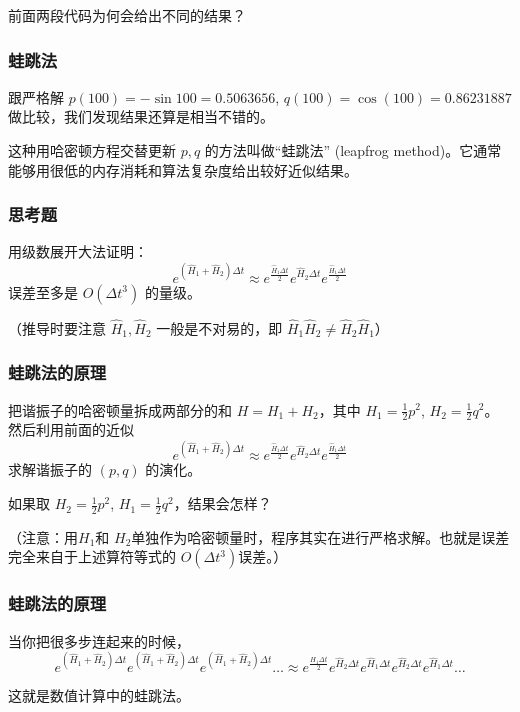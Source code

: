 \documentclass[CJK]{beamer}
\begin{document}
\begin{frame}


  前面两段代码为何会给出不同的结果？
  
\end{frame}


\begin{frame}

  \frametitle{蛙跳法}

  跟严格解 $p(100) = -\sin 100 = 0.5063656$, $q(100) = \cos(100)= 0.86231887$ 做比较，我们发现结果还算是相当不错的。

  \skiplines
  
  这种用哈密顿方程交替更新 $p,q$ 的方法叫做“蛙跳法” (leapfrog method)。它通常能够用很低的内存消耗和算法复杂度给出较好近似结果。

\end{frame}


\begin{frame}
  \frametitle{思考题}

  
  用级数展开大法证明：
  $$ e^{(\hat{H}_1+\hat{H}_2) \Delta t} \approx e^{\frac{\hat{H}_1\Delta t}{2}} e^{\hat{H}_2\Delta t}  e^{\frac{\hat{H}_1\Delta t}{2}} $$
  误差至多是 $O(\Delta t^3)$ 的量级。

  （推导时要注意 $\hat{H}_1, \hat{H}_2$ 一般是不对易的，即 $\hat{H}_1\hat{H}_2\ne \hat{H}_2\hat{H}_1$）
\end{frame}

\begin{frame}
  \frametitle{蛙跳法的原理}

  
  把谐振子的哈密顿量拆成两部分的和 $H=H_1+H_2$，其中 $H_1=\frac{1}{2}p^2$, $H_2=\frac{1}{2}q^2$。然后利用前面的近似
  $$ e^{(\hat{H}_1+\hat{H}_2) \Delta t} \approx e^{\frac{\hat{H}_1\Delta t}{2}} e^{\hat{H}_2\Delta t}  e^{\frac{\hat{H}_1\Delta t}{2}} $$
  求解谐振子的 $(p,q)$ 的演化。

  \skiplines
  
  如果取 $H_2=\frac{1}{2}p^2$, $H_1=\frac{1}{2}q^2$，结果会怎样？

  \skiplines
  
  （注意：用$H_1$和 $H_2$单独作为哈密顿量时，程序其实在进行严格求解。也就是误差完全来自于上述算符等式的 $O(\Delta t^3)$误差。）
\end{frame}

\begin{frame}
  \frametitle{蛙跳法的原理}
  当你把很多步连起来的时候，
  $$ e^{(\hat{H}_1+\hat{H}_2) \Delta t} e^{(\hat{H}_1+\hat{H}_2) \Delta t}e^{(\hat{H}_1+\hat{H}_2) \Delta t}\ldots \approx e^{\frac{\hat{H}_1\Delta t}{2}} e^{\hat{H}_2\Delta t}  e^{\hat{H}_1\Delta t} e^{\hat{H}_2\Delta t} e^{\hat{H}_1\Delta t} \ldots $$

  这就是数值计算中的蛙跳法。
  
\end{frame}
\end{document}
